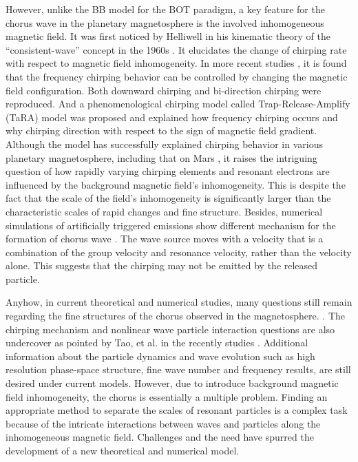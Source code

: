However, unlike the BB model for the BOT paradigm, a key feature for the chorus wave in the planetary magnetosphere is the involved inhomogeneous magnetic field. 
It was first noticed by Helliwell in his kinematic theory of the ``consistent-wave'' concept in the 1960s \cite{helliwell_theory_1967}.
It elucidates the change of chirping rate with respect to magnetic field inhomogeneity.
In more recent studies \cite{wu_controlling_2020,fujiwara2023}, it is found that the frequency chirping behavior can be controlled by changing the magnetic field configuration. Both downward chirping and bi-direction chirping were reproduced.
And a phenomenological chirping model called Trap-Release-Amplify (TaRA) model was proposed and explained how frequency chirping occurs and why chirping direction with respect to the sign of magnetic field gradient.
Although the model has successfully explained chirping behavior in various planetary magnetosphere, including that on Mars \cite{teng2023}, it raises the intriguing question of how rapidly varying chirping elements and resonant electrons are influenced by the background magnetic field's inhomogeneity.
This is despite the fact that the scale of the field's inhomogeneity is significantly larger than the characteristic scales of rapid changes and fine structure.
Besides, numerical simulations of artificially triggered emissions show different mechanism for the formation of chorus wave \cite{nogi2022,nogi2023}. 
The wave source moves with a velocity that is a combination of the group velocity and resonance velocity, rather than the velocity alone. This suggests that the chirping may not be emitted by the released particle.

Anyhow, in current theoretical and numerical studies, many questions still remain regarding the fine structures of the chorus observed in the magnetosphere. \cite{zhang2021}. 
The chirping mechanism and nonlinear wave particle interaction questions are also undercover as pointed by Tao, et al. in the recently studies \cite{tao_theoretical_2020,tao_trap-release-amplify_2021}. Additional information about the particle dynamics and wave evolution such as high resolution phase-space structure, fine wave number and frequency results, are still desired under current models.
However, due to introduce background magnetic field inhomogeneity, the chorus is essentially a multiple problem. 
Finding an appropriate method to separate the scales of resonant particles is a complex task because of the intricate interactions between waves and particles along the inhomogeneous magnetic field. 
Challenges and the need have spurred the development of a new theoretical and numerical model.

